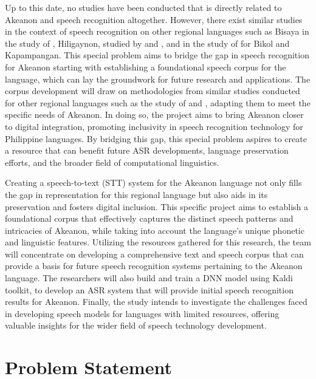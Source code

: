 Up to this date, no studies have been conducted that is directly related to Akeanon and speech recognition altogether. However, there exist similar studies in the context of speech recognition on other regional languages such as Bisaya in the study of , Hiligaynon, studied by  and , and in the study of  for Bikol and Kapampangan. This special problem aims to bridge the gap in speech recognition for Akeanon starting with establishing a foundational speech corpus for the language, which can lay the groundwork for future research and applications. The corpus development will draw on methodologies from similar studies conducted for other regional languages such as the study of  and , adapting them to meet the specific needs of Akeanon. In doing so, the project aims to bring Akeanon closer to digital integration, promoting inclusivity in speech recognition technology for Philippine languages. By bridging this gap, this special problem aspires to create a resource that can benefit future ASR developments, language preservation efforts, and the broader field of computational linguistics.

Creating a speech-to-text (STT) system for the Akeanon language not only fills the gap in representation for this regional language but also aids in its preservation and fosters digital inclusion. This specific project aims to establish a foundational corpus that effectively captures the distinct speech patterns and intricacies of Akeanon, while taking into account the language's unique phonetic and linguistic features. Utilizing the resources gathered for this research, the team will concentrate on developing a comprehensive text and speech corpus that can provide a basis for future speech recognition systems pertaining to the Akeanon language. The researchers will also build and train a DNN model using Kaldi toolkit, to develop an ASR system that will provide initial speech recognition results for Akeanon. Finally, the study intends to investigate the challenges faced in developing speech models for languages with limited resources, offering valuable insights for the wider field of speech technology development.


\section{Problem Statement}
\label{sec:problemstatement}

